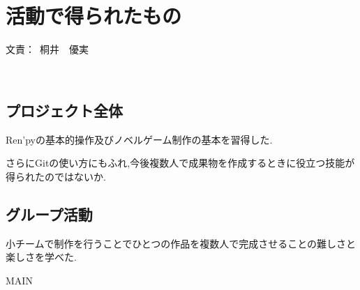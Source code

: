 \documentclass[a4paper]{jarticle}
\newcommand{\resp}[1]{\begin{flushright}文責：~#1\end{flushright}~\\}
\begin{document}
\fi

\section{活動で得られたもの}
  \resp{桐井　優実}
  \subsection{プロジェクト全体}
 Ren'pyの基本的操作及びノベルゲーム制作の基本を習得した.
 
 さらにGitの使い方にもふれ,今後複数人で成果物を作成するときに役立つ技能が得られたのではないか.

  \subsection{グループ活動}

小チームで制作を行うことでひとつの作品を複数人で完成させることの難しさと楽しさを学べた.



\expandafter\ifx\csname MAIN \endcsname\relax
  
\end{document}
